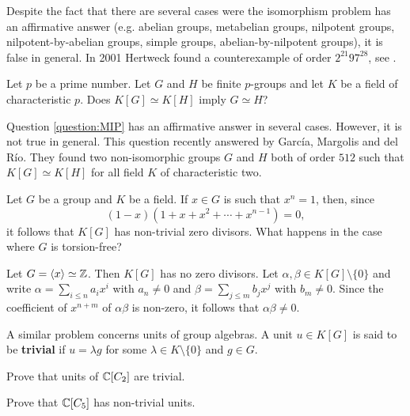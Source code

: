 Despite the fact that there are several cases were 
the isomorphism problem has an affirmative answer (e.g. abelian groups, 
metabelian groups, nilpotent groups, nilpotent-by-abelian groups, simple groups, 
abelian-by-nilpotent groups), it is false in general. In 2001  
Hertweck found a counterexample of order $2^{21}97^{28}$, see \cite{MR1847590}.  

\begin{question}
\label{question:MIP}
    Let $p$ be a prime number. Let 
    $G$ and $H$ be finite $p$-groups and let $K$ be a field of characteristic $p$. 
    Does $K[G]\simeq K[H]$ imply $G\simeq H$?
\end{question}   

Question \ref{question:MIP} has an affirmative answer in several cases. However, 
it is not true in general. This question recently answered by Garc\'ia, Margolis and
del R\'io. They found two non-isomorphic groups $G$ and $H$ both of order $512$ 
such that $K[G]\simeq K[H]$ for all field $K$ 
of characteristic two. 


Let $G$ be a group and $K$ be a field. If  
$x\in G$ is such that $x^n=1$, then, since 
\[
(1-x)(1+x+x^2+\cdots+x^{n-1})=0, 
\] 
it follows that $K[G]$ has non-trivial zero divisors. What happens in the case
where $G$ is torsion-free?

\begin{example}
	\label{example:k[Z]}
	Let $G=\langle x\rangle\simeq\mathbb{Z}$. Then $K[G]$ has no zero divisors. 
	Let $\alpha,\beta\in K[G]\setminus\{0\}$ and write 
	$\alpha=\sum_{i\leq n}a_ix^i$ with $a_n\ne 0$ and $\beta=\sum_{j\leq m}b_jx^j$
	with $b_m\ne 0$. Since the coefficient of $x^{n+m}$ of $\alpha\beta$ is non-zero,
	it follows that 
	$\alpha\beta\ne 0$.
\end{example}

A similar problem concerns units of group algebras.  A unit $u\in K[G]$ is said
to be \textbf{trivial} if $u=\lambda g$ for some $\lambda\in K\setminus\{0\}$ and
$g\in G$.	

\begin{exercise}
	Prove that units of $\mathbb{C}[C_2]$ are trivial. 
\end{exercise}

\begin{exercise}
	Prove that $\mathbb{C}[C_5]$ has non-trivial units. 
\end{exercise}


